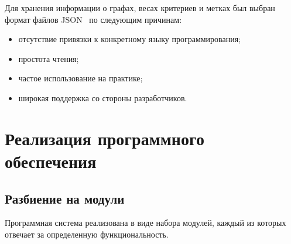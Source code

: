 Для хранения информации о графах, весах критериев и метках был выбран формат файлов JSON~\cite{json} по следующим причинам:
\begin{itemize}
    \item отсутствие привязки к конкретному языку программирования;
    \item простота чтения;
    \item частое использование на практике;
    \item широкая поддержка со стороны разработчиков.
\end{itemize}

\section{Реализация программного обеспечения}

\subsection{Разбиение на модули}

Программная система реализована в виде набора модулей, каждый из которых отвечает за определенную функциональность.

